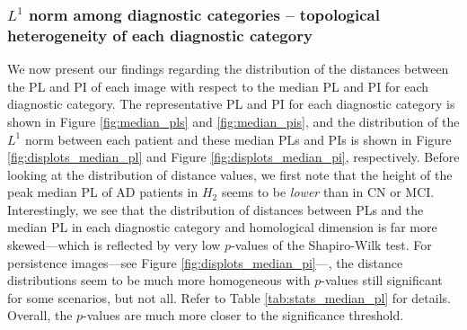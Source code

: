\documentclass{article}
\begin{document}
\subsubsection{$L^1$ norm among diagnostic categories -- topological
  heterogeneity of each diagnostic category}\label{sec:results_between_images}

We now present our findings regarding the distribution of the distances between the PL and PI of
each image with respect to the median PL and PI for each diagnostic category. The representative PL
and PI for each diagnostic category is shown in Figure \ref{fig:median_pls} and
\ref{fig:median_pis}, and the distribution of the $L^1$ norm between each patient and these median
PLs and PIs is shown in Figure \ref{fig:displots_median_pl} and Figure \ref{fig:displots_median_pi},
respectively. Before looking at the distribution of distance values, we first note that the height
of the peak median PL of AD patients in $H_2$ seems to be \emph{lower} than in CN or MCI.
Interestingly, we see that the distribution of distances between PLs and the median PL in each
diagnostic category and homological dimension is far more skewed---which is reflected by very low
$p$-values of the Shapiro-Wilk test. For persistence images---see Figure
\ref{fig:displots_median_pi}---, the distance distributions seem to be much more homogeneous with
$p$-values still significant for some scenarios, but not all. Refer to Table
\ref{tab:stats_median_pl} for details. Overall, the $p$-values are much more closer to the
significance threshold.
\end{document}

